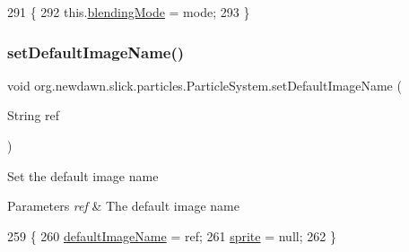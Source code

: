\begin{DoxyCode}
291                                           \{
292         this.\mbox{\hyperlink{classorg_1_1newdawn_1_1slick_1_1particles_1_1_particle_system_af4dc719d60d72b365f59850a2cfdf7a6}{blendingMode}} = mode;
293     \}
\end{DoxyCode}
\mbox{\label{classorg_1_1newdawn_1_1slick_1_1particles_1_1_particle_system_a0751d21135054b0561cc37458ff27a36}} 
\subsubsection{\texorpdfstring{set\+Default\+Image\+Name()}{setDefaultImageName()}}
{\footnotesize\ttfamily void org.\+newdawn.\+slick.\+particles.\+Particle\+System.\+set\+Default\+Image\+Name (\begin{DoxyParamCaption}\item[{String}]{ref }\end{DoxyParamCaption})\hspace{0.3cm}{\ttfamily [inline]}}

Set the default image name


\begin{DoxyParams}{Parameters}
{\em ref} & The default image name \\
\hline
\end{DoxyParams}

\begin{DoxyCode}
259                                                 \{
260         \mbox{\hyperlink{classorg_1_1newdawn_1_1slick_1_1particles_1_1_particle_system_abfa2b543e5b6bca876a15493efb25688}{defaultImageName}} = ref;
261         \mbox{\hyperlink{classorg_1_1newdawn_1_1slick_1_1particles_1_1_particle_system_a42359ac9175deb095eaa520263e352da}{sprite}} = null;
262     \}
\end{DoxyCode}
\mbox{\label{classorg_1_1newdawn_1_1slick_1_1particles_1_1_particle_system_a2591ccf6dfe2edfee2d53df57473020b}} 
